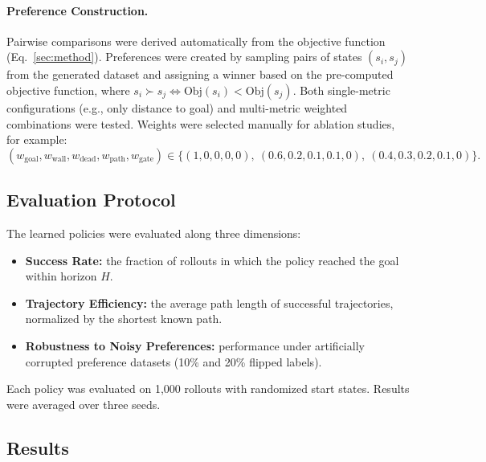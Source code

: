 \documentclass[a4paper,oneside,10pt,ngerman,english]{scrartcl}
\begin{document}
\paragraph{Preference Construction.}
Pairwise comparisons were derived automatically from the objective function (Eq.~\ref{sec:method}). 
Preferences were created by sampling pairs of states $(s_i, s_j)$ from the generated dataset and assigning a winner based on the pre-computed objective function, where $s_i \succ s_j \iff \mathrm{Obj}(s_i) < \mathrm{Obj}(s_j)$.
Both single-metric configurations (e.g., only distance to goal) and multi-metric weighted combinations were tested. 
Weights were selected manually for ablation studies, for example:
\[
(w_{\text{goal}}, w_{\text{wall}}, w_{\text{dead}}, w_{\text{path}}, w_{\text{gate}}) \in 
\{(1,0,0,0,0), \ (0.6,0.2,0.1,0.1,0), \ (0.4,0.3,0.2,0.1,0)\}.
\]

\subsection{Evaluation Protocol}

The learned policies were evaluated along three dimensions:

\begin{itemize}
    \item \textbf{Success Rate:} the fraction of rollouts in which the policy reached the goal within horizon $H$.
    \item \textbf{Trajectory Efficiency:} the average path length of successful trajectories, normalized by the shortest known path.
    \item \textbf{Robustness to Noisy Preferences:} performance under artificially corrupted preference datasets (10\% and 20\% flipped labels).
\end{itemize}

Each policy was evaluated on 1,000 rollouts with randomized start states. 
Results were averaged over three seeds.

\subsection{Results}
\end{document}
